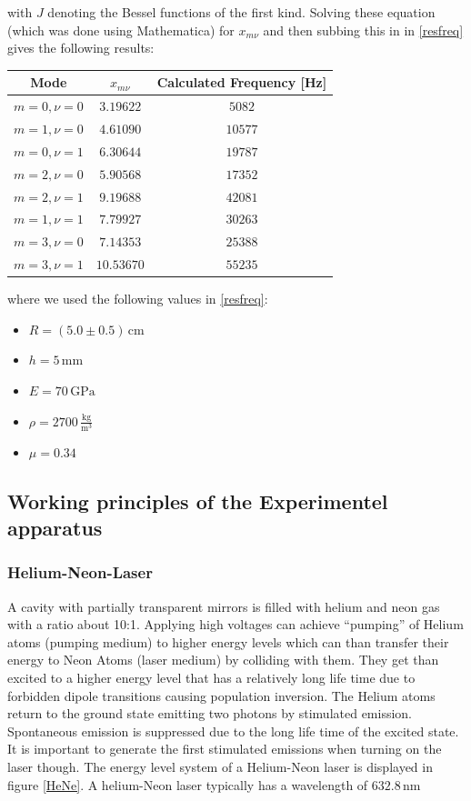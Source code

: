 with $J$ denoting the Bessel functions of the first kind. Solving these equation (which was done using Mathematica) for $x_{m\nu}$ and then subbing this in in \ref{resfreq} gives the following results:

{\centering{}
	\begin{tabular}{c|c|c}
		Mode 		& $x_{m\nu}$ & Calculated Frequency [Hz] 	 \\ \hline\hline
		$m=0,\nu=0$	&$3.19622$   &$5082$						\\ \hline
		$m=1,\nu=0$	& $4.61090$  & $10577$					\\ \hline
		$m=0,\nu=1$	& $6.30644$  & $19787$					\\ \hline
		$m=2,\nu=0$	& $5.90568$  & $17352$					\\ \hline
		$m=2,\nu=1$	& $9.19688$  & $42081$					\\ \hline
		$m=1,\nu=1$	& $7.79927$  & $30263$				     \\ \hline
		$m=3,\nu=0$	& $7.14353$  & $25388$                \\ \hline
     	$m=3,\nu=1$	& $10.53670$ & $55235$
	\end{tabular} }\vskip 0.2cm

where we used the following values in \ref{resfreq}:

\begin{itemize}
	\item $ R = (5.0\pm0.5)\,\mathrm{cm}$
	\item $h=5\,\mathrm{mm}$
	\item $E=70\,\mathrm{GPa}$
	\item $\rho = 2700\,\frac{\mathrm{kg}}{\mathrm{m^3}}$
	\item $\mu = 0.34$ 
\end{itemize}



\subsection{Working principles of the Experimentel apparatus}

\subsubsection{Helium-Neon-Laser \label{HeNe1}}

A cavity with partially transparent mirrors is filled with helium and neon gas with a ratio about 10:1. Applying high voltages can achieve ``pumping'' of Helium atoms (pumping medium) to higher energy levels which can than transfer their energy to Neon Atoms (laser medium) by colliding with them. They get than excited to a higher energy level that has a relatively long life time due to forbidden dipole transitions causing population inversion.
The Helium atoms return to the ground state emitting two photons by stimulated emission. Spontaneous emission is suppressed due to the long life time of the excited state. It is important to generate the first stimulated emissions when turning on the laser though.
The energy level system of a Helium-Neon laser is displayed in figure \ref{HeNe}. A helium-Neon laser typically has a wavelength of $632.8\,\mathrm{nm}$

